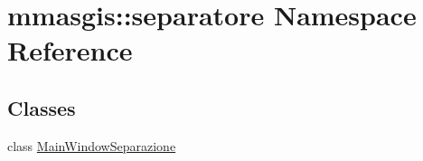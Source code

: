 \hypertarget{namespacemmasgis_1_1separatore}{
\section{mmasgis::separatore Namespace Reference}
\label{namespacemmasgis_1_1separatore}
}
\subsection*{Classes}
\begin{DoxyCompactItemize}
\item 
class \hyperlink{classmmasgis_1_1separatore_1_1MainWindowSeparazione}{MainWindowSeparazione}
\end{DoxyCompactItemize}
